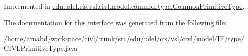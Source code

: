 Implemented in \hyperlink{classedu_1_1udel_1_1cis_1_1vsl_1_1civl_1_1model_1_1common_1_1type_1_1CommonPrimitiveType_a7c594169f53a7bba0d734d27f17a9395}{edu.\+udel.\+cis.\+vsl.\+civl.\+model.\+common.\+type.\+Common\+Primitive\+Type}.



The documentation for this interface was generated from the following file\+:\begin{DoxyCompactItemize}
\item 
/home/arnabd/workspace/civl/trunk/src/edu/udel/cis/vsl/civl/model/\+I\+F/type/C\+I\+V\+L\+Primitive\+Type.\+java\end{DoxyCompactItemize}
